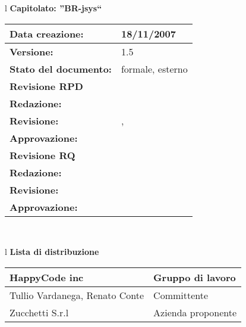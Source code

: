 

\newcommand{\lv}{ 1.5 } %
\newcommand{\dt}{ Specifica Tecnica }%


\begin{center}
\thispagestyle{plain}
\begin{table}[htbp]
\large{
\begin{tabular}{l}
\Large{\textbf{\textsf{Capitolato: ''BR-jsys``}}} \\
\begin{tabular}{|p{6cm}|p{6cm}|} \hline
\textbf{Data creazione:} & 18/11/2007 \\ \hline
\textbf{Versione:} & \lv \\ \hline
\textbf{Stato del documento:} & formale, esterno \\ \hline
\textbf{Revisione RPD} &   \\ \hline
\textbf{Redazione:} & \MB \\ \hline
\textbf{Revisione:} & \AT , \ET  \\ \hline
\textbf{Approvazione:}  & \MM \\ \hline
\textbf{Revisione RQ} &   \\ \hline
\textbf{Redazione:} & \ET \\ \hline
\textbf{Revisione:} & \FC \\ \hline
\textbf{Approvazione:}  & \AT \\ \hline
\end{tabular} \\
\end{tabular}
}
\end{table}
\end{center}

\begin{center}
\begin{table}[hbtp]
\large{
\begin{tabular}{l}
\large{\textbf{\textsf{Lista di distribuzione}}} \\
\begin{tabular}{|p{6cm}|p{6cm}|} \hline
{HappyCode inc}& Gruppo di lavoro\\ \hline
{Tullio Vardanega, Renato Conte}& Committente \\ \hline 
{Zucchetti S.r.l}& Azienda proponente\\ \hline
\end{tabular} \\
\end{tabular}
}
\end{table}
\end{center}

